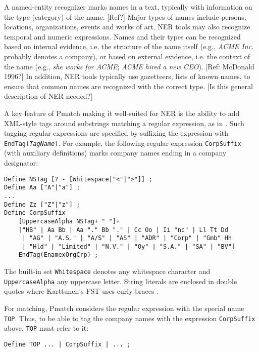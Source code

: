 \documentclass{llncs}
\begin{document}
A named-entity recognizer marks names in a text, typically with
information on the type (category) of the name. \textsf{[Ref?]} Major
types of names include persons, locations, organizations, events and
works of art. NER tools may also recognize temporal and numeric
expressions. Names and their types can be recognized based on internal
evidence, i.e. the structure of the name itself (e.g., \textit{ACME
  Inc.} probably denotes a company), or based on external evidence,
i.e. the context of the name (e.g., \textit{she works for ACME};
\textit{ACME hired a new CEO}). \textsf{[Ref: McDonald 1996?]} In
addition, NER tools typically use gazetteers, lists of known names, to
ensure that common names are recognized with the correct type.
\textsf{[Is this general description of NER needed?]}

A key feature of Pmatch making it well-suited for NER is the ability
to add XML-style tags around substrings matching a regular expression,
as in \cite{karttunen/2011}. Such tagging regular expressions are
specified by suffixing the expression with
\texttt{EndTag(\textit{TagName})}. For example, the following regular
expression \texttt{CorpSuffix} (with auxiliary definitions) marks
company names ending in a company designator:

\begin{verbatim}
Define NSTag [? - [Whitespace|"<"|">"]] ;
Define Aa ["A"|"a"] ;
...
Define Zz ["Z"|"z"] ;
Define CorpSuffix
    [UppercaseAlpha NSTag+ " "]+
    ["HB" | Aa Bb | Aa "." Bb "." | Cc Oo | Ii "nc" | Ll Tt Dd
     | "AG" | "A.S." | "A/S" | "AS" | "ADR" | "Corp" | "Gmb" Hh
     | "Hld" | "Limited" | "N.V." | "Oy" | "S.A." | "SA" | "BV"]
    EndTag(EnamexOrgCrp) ;
\end{verbatim}

\begin{sloppypar}
The built-in set \texttt{Whitespace} denotes any whitespace character
and \texttt{UppercaseAlpha} any uppercase letter. String literals are
enclosed in double quotes where Karttunen's FST uses curly braces
\cite{karttunen/2011}.
\end{sloppypar}

For matching, Pmatch considers the regular expression with the special
name \texttt{TOP}. Thus, to be able to tag the company names with the
expression \texttt{CorpSuffix} above, \texttt{TOP} must refer to it:

\begin{verbatim}
Define TOP ... | CorpSuffix | ... ;
\end{verbatim}
\end{document}
